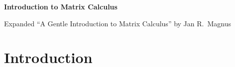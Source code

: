 \documentclass[12pt,a4paper]{article}
\theoremstyle{definition}
\begin{document}
\begingroup
\centering
{\LARGE\bfseries Introduction to Matrix Calculus\par}
\vspace{2pt}
{\large Expanded ``A Gentle Introduction to Matrix Calculus'' by Jan R.\ Magnus\par}
\vspace{4pt}
\endgroup


\section{Introduction}\label{sec:1}
\end{document}

